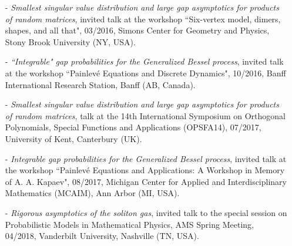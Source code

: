 \documentclass[margin]{res}
\begin{document}
\begin{resume}
\begin{itemize}
\item[-] \emph{Smallest singular value distribution and large gap asymptotics for products of random matrices}, invited talk at the workshop ``Six-vertex model, dimers, shapes, and all that", 03/2016, Simons Center for Geometry and Physics, Stony Brook University (NY, USA).
\item[-] \emph{``Integrable" gap probabilities for the Generalized Bessel process}, invited talk at the workshop ``Painlev\'e Equations and Discrete Dynamics", 10/2016, Banff International Research Station, Banff (AB, Canada).
\item[-] \emph{Smallest singular value distribution and large gap asymptotics for products of random matrices}, talk at the 14th International Symposium on Orthogonal Polynomials, Special Functions and Applications (OPSFA14), 07/2017, University of Kent, Canterbury (UK). 
\item[-] \emph{Integrable gap probabilities for the Generalized Bessel process}, invited talk at the workshop ``Painlev\'e Equations and Applications: A Workshop in Memory of A. A. Kapaev", 08/2017, Michigan Center for Applied and Interdisciplinary Mathematics (MCAIM), Ann Arbor (MI, USA).
\item[-] \emph{Rigorous asymptotics of the soliton gas}, invited talk to the special session on Probabilistic Models in Mathematical Physics, AMS Spring Meeting, 04/2018, Vanderbilt University, Nashville (TN, USA).
\\
 \end{itemize}
 

\end{resume}
\end{document}

